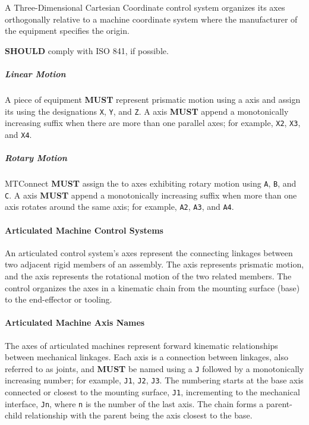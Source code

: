 A Three-Dimensional Cartesian Coordinate control system organizes its axes orthogonally relative to a machine coordinate system where the manufacturer of the equipment specifies the origin. 

  \textbf{SHOULD} comply with ISO 841, if possible.

\subparagraph{Linear Motion}\mbox{}
\label{sec:Linear Motion}

A piece of equipment \textbf{MUST} represent prismatic motion using a  axis  and assign its  using the designations \texttt{X}, \texttt{Y}, and \texttt{Z}. A  axis  \textbf{MUST} append a monotonically increasing suffix when there are more than one parallel axes; for example, \texttt{X2}, \texttt{X3}, and \texttt{X4}. 

\subparagraph{Rotary Motion}\mbox{}
\label{sec:Rotary Motion}

\gls{MTConnect} \textbf{MUST} assign the  to  axes exhibiting rotary motion using \texttt{A}, \texttt{B}, and \texttt{C}. A  axis  \textbf{MUST} append a monotonically increasing suffix when more than one  axis rotates around the same  axis; for example, \texttt{A2}, \texttt{A3}, and \texttt{A4}. 

\paragraph{Articulated Machine Control Systems}
\label{sec:Articulated Machine Control Systems}

An articulated control system's axes represent the connecting linkages between two adjacent rigid members of an assembly. The  axis represents prismatic motion, and the  axis represents the rotational motion of the two related members. The control organizes the axes in a kinematic chain from the mounting surface (base) to the end-effector or tooling.

\paragraph{Articulated Machine Axis Names}
\label{sec:Articulated Machine Axis Names}

The axes of articulated machines represent forward kinematic relationships between mechanical linkages. Each axis is a connection between linkages, also referred to as joints, and \textbf{MUST} be named using a \texttt{J} followed by a monotonically increasing number; for example, \texttt{J1}, \texttt{J2}, \texttt{J3}.  The numbering starts at the base axis connected or closest to the mounting surface, \texttt{J1}, incrementing to the mechanical interface, \texttt{Jn}, where \texttt{n} is the number of the last axis. The chain forms a parent-child relationship with the parent being the axis closest to the base.

